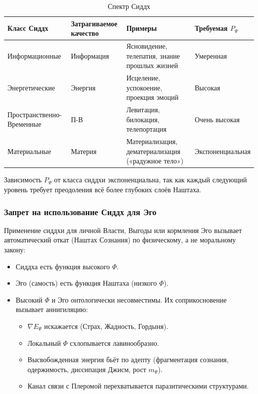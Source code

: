 \documentclass[a4paper,12pt]{article}
\begin{document}
\begin{table}[H]
	\centering
	\begin{tabular}{|p{3cm}|p{3cm}|p{5cm}|p{4cm}|}
		\hline
		\textbf{Класс Сиддх} & \textbf{Затрагиваемое качество} & \textbf{Примеры} & \textbf{Требуемая $P_{\Psi}$} \\
		\hline
		Информационные & Информация & Ясновидение, телепатия, знание прошлых жизней & Умеренная \\
		\hline
		Энергетические & Энергия & Исцеление, успокоение, проекция эмоций & Высокая \\
		\hline
		Пространственно-Временные & П-В & Левитация, билокация, телепортация & Очень высокая \\
		\hline
		Материальные & Материя & Материализация, дематериализация («радужное тело») & Экспоненциальная \\
		\hline
	\end{tabular}
	\caption{Спектр Сиддх}
\end{table}

Зависимость $P_{\Psi}$ от класса сиддхи экспоненциальна, так как каждый следующий уровень требует преодоления всё более глубоких слоёв Наштаха.

\subsubsection{Запрет на использование Сиддх для Эго}

Применение сиддхи для личной Власти, Выгоды или кормления Эго вызывает автоматический откат (Наштах Сознания) по физическому, а не моральному закону:

\begin{itemize}
	\item Сиддха есть функция высокого $\Phi$.
	\item Эго (самость) есть функция Наштаха (низкого $\Phi$).
	\item Высокий $\Phi$ и Эго онтологически несовместимы. Их соприкосновение вызывает аннигиляцию:
	\begin{itemize}
		\item $\nabla E_{\Psi}$ искажается (Страх, Жадность, Гордыня).
		\item Локальный $\Phi$ схлопывается лавинообразно.
		\item Высвобожденная энергия бьёт по адепту (фрагментация сознания, одержимость, диссипация Джисм, рост $m_{\Psi}$).
		\item Канал связи с Плеромой перехватывается паразитическими структурами.
	\end{itemize}
\end{itemize}
\end{document}
